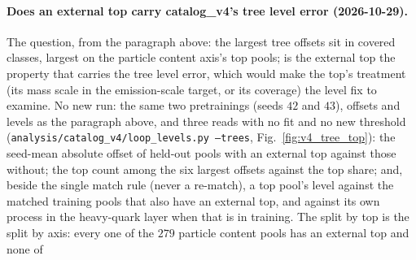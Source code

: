 \documentclass[11pt]{article}
\newcommand{\code}[1]{\texttt{#1}}
\begin{document}
\paragraph{Does an external top carry catalog\_v4's tree level error (2026-10-29).}\label{par:v4_tree_top} The
question, from the paragraph above: the largest tree offsets sit in covered classes, largest on the particle content
axis's top pools; is the external top the property that carries the tree level error, which would make the top's
treatment (its mass scale in the emission-scale target, or its coverage) the level fix to examine. No new run: the same
two pretrainings (seeds $42$ and $43$), offsets and levels as the paragraph above, and three reads with no fit and no
new threshold (\code{analysis/catalog\_v4/loop\_levels.py --trees}, Fig.~\ref{fig:v4_tree_top}): the seed-mean
absolute offset of held-out pools with an external top against those without; the top count among the six largest
offsets against the top share; and, beside the single match rule (never a re-match), a top pool's level against the
matched training pools that also have an external top, and against its own process in the heavy-quark layer when that
is in training.
The split by top is the split by axis: every one of the $279$ particle content pools has an external top and none of
\end{document}
